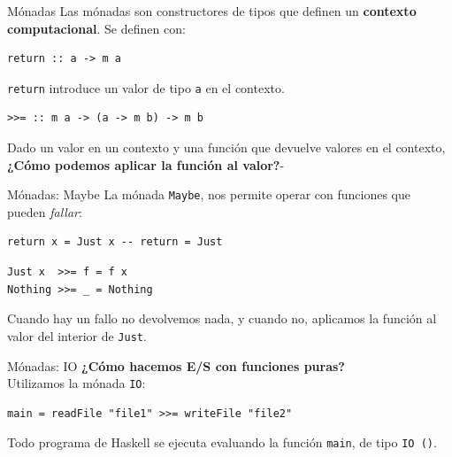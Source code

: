 \begin{frame}[fragile]{Mónadas}
Las mónadas son constructores de tipos que definen un \textbf{contexto computacional}.
Se definen con:

\espacio

\begin{lstlisting}
return :: a -> m a
\end{lstlisting}
\texttt{return} introduce un valor de tipo \texttt{a} en el contexto.

\espacio

\begin{lstlisting}
>>= :: m a -> (a -> m b) -> m b
\end{lstlisting}
Dado un valor en un contexto y una función que devuelve valores en el contexto,
\textbf{¿Cómo podemos aplicar la función al valor?}-
\end{frame}

\begin{frame}[fragile]{Mónadas: Maybe}
La mónada \texttt{Maybe}, nos permite operar con funciones que pueden \textit{fallar}:

\begin{lstlisting}
return x = Just x -- return = Just
\end{lstlisting}

\espacio

\begin{lstlisting}
Just x  >>= f = f x
Nothing >>= _ = Nothing
\end{lstlisting}
Cuando hay un fallo no devolvemos nada, y cuando no, aplicamos la función al valor
del interior de \texttt{Just}.
\end{frame}

\begin{frame}[fragile]{Mónadas: IO}
\textbf{¿Cómo hacemos E/S con funciones puras?}\\
Utilizamos la mónada \texttt{IO}:

\espacio

\begin{lstlisting}
main = readFile "file1" >>= writeFile "file2"
\end{lstlisting}

\espacio

Todo programa de Haskell se ejecuta evaluando la función \texttt{main}, de tipo
\texttt{IO ()}.

\end{frame}
